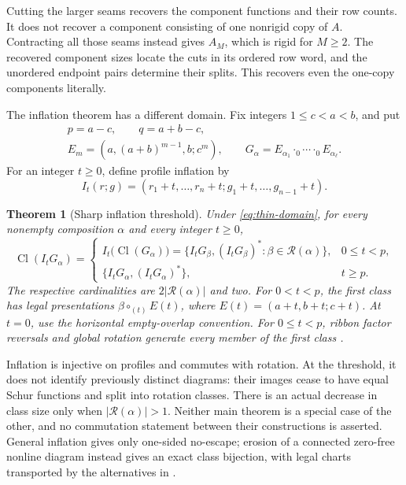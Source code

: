 \documentclass[11pt,a4paper]{amsart}
\numberwithin{equation}{section}
\theoremstyle{plain}
\newtheorem{theorem}{Theorem}[section]
\theoremstyle{definition}
\begin{document}
Cutting the larger seams recovers the component functions and their row
counts.  It does not recover a component consisting of one nonrigid copy
of \(A\).  Contracting all those seams instead gives \(A_M\), which
is rigid for \(M\ge2\).  The recovered component sizes locate the cuts
in its ordered row word, and the unordered endpoint pairs determine their
splits.  This recovers even the one-copy components literally.

The inflation theorem has a different domain.  Fix integers
\(1\le c<a<b\), and put
\begin{equation}\label{eq:thin-domain}
 \begin{gathered}
 p=a-c,\qquad q=a+b-c,\\
 E_m=(a,(a+b)^{m-1},b;c^m),\qquad
 G_\alpha=E_{\alpha_1}\cdot_0\cdots\cdot_0 E_{\alpha_\ell}.
 \end{gathered}
\end{equation}
For an integer \(t\ge0\), define profile inflation by
\begin{equation}\label{eq:inflation}
 I_t(r;g)=(r_1+t,\ldots,r_n+t;g_1+t,\ldots,g_{n-1}+t).
\end{equation}

\begin{theorem}[Sharp inflation threshold]\label{thm:sharp-inflation}
Under \eqref{eq:thin-domain}, for every nonempty composition \(\alpha\)
and every integer \(t\ge0\),
\begin{equation}\label{eq:inflation-class}
 \operatorname{Cl}(I_tG_\alpha)=
 \begin{cases}
 I_t\bigl(\operatorname{Cl}(G_\alpha)\bigr)
 =\{I_tG_\beta,(I_tG_\beta)^*: \beta\in\mathcal R(\alpha)\},
       &0\le t<p,\\[2mm]
 \{I_tG_\alpha,(I_tG_\alpha)^*\},&t\ge p.
 \end{cases}
\end{equation}
The respective cardinalities are \(2|\mathcal R(\alpha)|\) and two.
For \(0<t<p\), the first class has legal presentations
\(\beta\circ_{(t)}E(t)\), where \(E(t)=(a+t,b+t;c+t)\).
At \(t=0\), use the horizontal empty-overlap convention.
For \(0\le t<p\), ribbon factor reversals and global rotation generate
every member of the first class
\cite{Shields2026Coarsenings}.
\end{theorem}

Inflation is injective on profiles and commutes with rotation.  At the
threshold, it does not identify previously distinct diagrams: their images
cease to have equal Schur functions and split into rotation classes.
There is an actual decrease in class size only when
\(|\mathcal R(\alpha)|>1\).  Neither main theorem is a special case
of the other, and no commutation statement between their constructions
is asserted.
General inflation gives only one-sided no-escape; erosion of a connected
zero-free nonline diagram instead gives an exact class bijection, with
legal charts transported by the alternatives in .
\end{document}
